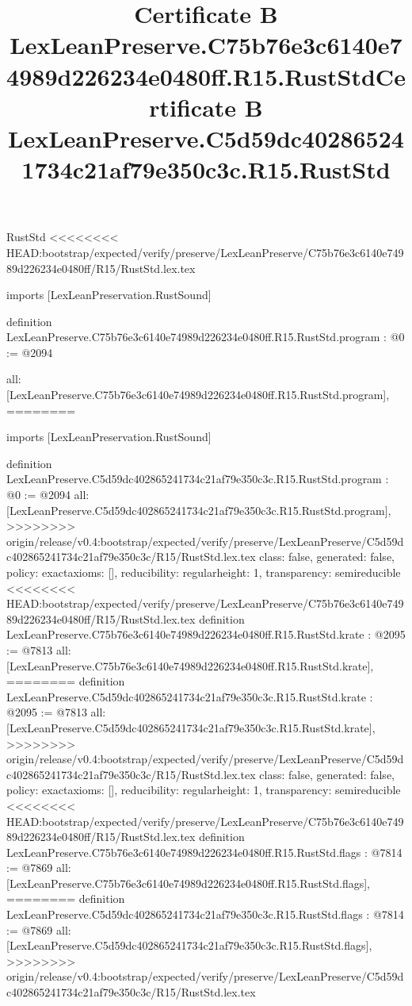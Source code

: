 \begin{lexlean}{RustStd}
<<<<<<<< HEAD:bootstrap/expected/verify/preserve/LexLeanPreserve/C75b76e3c6140e74989d226234e0480ff/R15/RustStd.lex.tex
\title{Certificate B LexLeanPreserve.C75b76e3c6140e74989d226234e0480ff.R15.RustStd}
\begin{coremodule}
imports [LexLeanPreservation.RustSound]

definition LexLeanPreserve.C75b76e3c6140e74989d226234e0480ff.R15.RustStd.program : @0 := @2094 {
  all: [LexLeanPreserve.C75b76e3c6140e74989d226234e0480ff.R15.RustStd.program],
========
\title{Certificate B LexLeanPreserve.C5d59dc402865241734c21af79e350c3c.R15.RustStd}
\begin{coremodule}
imports [LexLeanPreservation.RustSound]

definition LexLeanPreserve.C5d59dc402865241734c21af79e350c3c.R15.RustStd.program : @0 := @2094 {
  all: [LexLeanPreserve.C5d59dc402865241734c21af79e350c3c.R15.RustStd.program],
>>>>>>>> origin/release/v0.4:bootstrap/expected/verify/preserve/LexLeanPreserve/C5d59dc402865241734c21af79e350c3c/R15/RustStd.lex.tex
  class: false,
  generated: false,
  policy: exact{axioms: []},
  reducibility: regular{height: 1},
  transparency: semireducible
}
<<<<<<<< HEAD:bootstrap/expected/verify/preserve/LexLeanPreserve/C75b76e3c6140e74989d226234e0480ff/R15/RustStd.lex.tex
definition LexLeanPreserve.C75b76e3c6140e74989d226234e0480ff.R15.RustStd.krate : @2095 := @7813 {
  all: [LexLeanPreserve.C75b76e3c6140e74989d226234e0480ff.R15.RustStd.krate],
========
definition LexLeanPreserve.C5d59dc402865241734c21af79e350c3c.R15.RustStd.krate : @2095 := @7813 {
  all: [LexLeanPreserve.C5d59dc402865241734c21af79e350c3c.R15.RustStd.krate],
>>>>>>>> origin/release/v0.4:bootstrap/expected/verify/preserve/LexLeanPreserve/C5d59dc402865241734c21af79e350c3c/R15/RustStd.lex.tex
  class: false,
  generated: false,
  policy: exact{axioms: []},
  reducibility: regular{height: 1},
  transparency: semireducible
}
<<<<<<<< HEAD:bootstrap/expected/verify/preserve/LexLeanPreserve/C75b76e3c6140e74989d226234e0480ff/R15/RustStd.lex.tex
definition LexLeanPreserve.C75b76e3c6140e74989d226234e0480ff.R15.RustStd.flags : @7814 := @7869 {
  all: [LexLeanPreserve.C75b76e3c6140e74989d226234e0480ff.R15.RustStd.flags],
========
definition LexLeanPreserve.C5d59dc402865241734c21af79e350c3c.R15.RustStd.flags : @7814 := @7869 {
  all: [LexLeanPreserve.C5d59dc402865241734c21af79e350c3c.R15.RustStd.flags],
>>>>>>>> origin/release/v0.4:bootstrap/expected/verify/preserve/LexLeanPreserve/C5d59dc402865241734c21af79e350c3c/R15/RustStd.lex.tex
}}}
\end{coremodule}}
\end{coremodule}
\end{lexlean}
